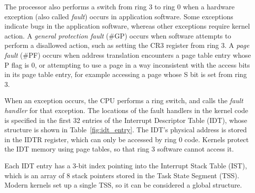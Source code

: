 
The processor also performs a switch from ring 3 to ring 0 when a hardware
exception (also called \textit{fault}) occurs in application software.  Some
exceptions indicate bugs in the application software, whereas other exceptions
require kernel action. A \textit{general protection fault} (\#GP) occurs when
software attempts to perform a disallowed action, such as setting the CR3
register from ring 3. A \textit{page fault} (\#PF) occurs when address
translation encounters a page table entry whose P flag is 0, or attempting to
use a page in a way inconsistent with the access bits in its page table entry,
for example accessing a page whose S bit is set from ring 3.


When an exception occurs, the CPU performs a ring switch, and calls the
\textit{fault handler} for that exception. The locations of the fault handlers
in the kernel code is specified in the first 32 entries of the Interrupt
Descriptor Table (IDT), whose structure is shown in Table~\ref{fig:idt_entry}.
The IDT's physical address is stored in the IDTR register, which can only be
accessed by ring 0 code. Kernels protect the IDT memory using page tables, so
that ring 3 software cannot access it.

\begin{table}[hbt]
  \caption{
    The fields of an IDT entry in 64-bit mode. Each entry points to a fault or
    interrupt handler.
  }
  \label{fig:idt_entry}
\end{table}

Each IDT entry has a 3-bit index pointing into the Interrupt Stack Table (IST),
which is an array of 8 stack pointers stored in the Task State Segment (TSS).
Modern kernels set up a single TSS, so it can be considered a global structure.




